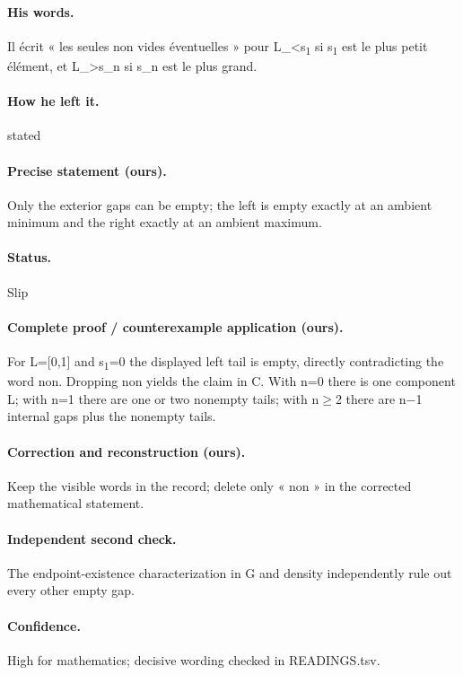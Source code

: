 \paragraph{His words.} Il écrit « les seules non vides éventuelles » pour L\_<s\textsubscript{1} si s\textsubscript{1} est le plus petit élément, et L\_>s\_n si s\_n est le plus grand.

\paragraph{How he left it.} stated

\paragraph{Precise statement (ours).} Only the exterior gaps can be empty; the left is empty exactly at an ambient minimum and the right exactly at an ambient maximum.

\paragraph{Status.} Slip

\paragraph{Complete proof / counterexample application (ours).} For L=[0,1] and s\textsubscript{1}=0 the displayed left tail is empty, directly contradicting the word non. Dropping non yields the claim in C. With n=0 there is one component L; with n=1 there are one or two nonempty tails; with n\ensuremath{\geq}2 there are n\ensuremath{-}1 internal gaps plus the nonempty tails.

\paragraph{Correction and reconstruction (ours).} Keep the visible words in the record; delete only « non » in the corrected mathematical statement.

\paragraph{Independent second check.} The endpoint-existence characterization in G and density independently rule out every other empty gap.

\paragraph{Confidence.} High for mathematics; decisive wording checked in READINGS.tsv.

